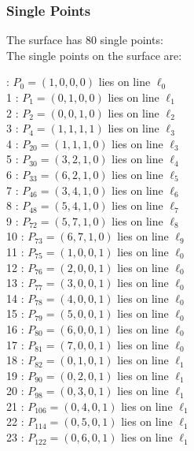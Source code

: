 \documentclass{article}
\begin{document}
{\subsubsection*{Single Points}
The surface has 80 single points:\\
The single points on the surface are:\\
\begin{multicols}{2}
 : $P_{0}=( 1, 0, 0, 0 )$ lies on line $\ell_{0}$\\
1 : $P_{1}=( 0, 1, 0, 0 )$ lies on line $\ell_{1}$\\
2 : $P_{2}=( 0, 0, 1, 0 )$ lies on line $\ell_{2}$\\
3 : $P_{4}=( 1, 1, 1, 1 )$ lies on line $\ell_{3}$\\
4 : $P_{20}=( 1, 1, 1, 0 )$ lies on line $\ell_{3}$\\
5 : $P_{30}=( 3, 2, 1, 0 )$ lies on line $\ell_{4}$\\
6 : $P_{33}=( 6, 2, 1, 0 )$ lies on line $\ell_{5}$\\
7 : $P_{46}=( 3, 4, 1, 0 )$ lies on line $\ell_{6}$\\
8 : $P_{48}=( 5, 4, 1, 0 )$ lies on line $\ell_{7}$\\
9 : $P_{72}=( 5, 7, 1, 0 )$ lies on line $\ell_{8}$\\
10 : $P_{73}=( 6, 7, 1, 0 )$ lies on line $\ell_{9}$\\
11 : $P_{75}=( 1, 0, 0, 1 )$ lies on line $\ell_{0}$\\
12 : $P_{76}=( 2, 0, 0, 1 )$ lies on line $\ell_{0}$\\
13 : $P_{77}=( 3, 0, 0, 1 )$ lies on line $\ell_{0}$\\
14 : $P_{78}=( 4, 0, 0, 1 )$ lies on line $\ell_{0}$\\
15 : $P_{79}=( 5, 0, 0, 1 )$ lies on line $\ell_{0}$\\
16 : $P_{80}=( 6, 0, 0, 1 )$ lies on line $\ell_{0}$\\
17 : $P_{81}=( 7, 0, 0, 1 )$ lies on line $\ell_{0}$\\
18 : $P_{82}=( 0, 1, 0, 1 )$ lies on line $\ell_{1}$\\
19 : $P_{90}=( 0, 2, 0, 1 )$ lies on line $\ell_{1}$\\
20 : $P_{98}=( 0, 3, 0, 1 )$ lies on line $\ell_{1}$\\
21 : $P_{106}=( 0, 4, 0, 1 )$ lies on line $\ell_{1}$\\
22 : $P_{114}=( 0, 5, 0, 1 )$ lies on line $\ell_{1}$\\
23 : $P_{122}=( 0, 6, 0, 1 )$ lies on line $\ell_{1}$\\

\end{multicols}}
\end{document}
